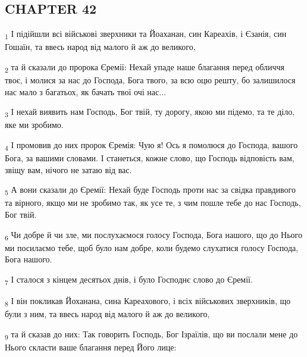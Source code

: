 \subsection{CHAPTER 42}
\begin{tcolorbox}
\textsubscript{1} І підійшли всі військові зверхники та Йоаханан, син Кареахів, і Єзанія, син Гошаїн, та ввесь народ від малого й аж до великого,
\end{tcolorbox}
\begin{tcolorbox}
\textsubscript{2} та й сказали до пророка Єремії: Нехай упаде наше благання перед обличчя твоє, і молися за нас до Господа, Бога твого, за всю оцю решту, бо залишилося нас мало з багатьох, як бачать твої очі нас...
\end{tcolorbox}
\begin{tcolorbox}
\textsubscript{3} І нехай виявить нам Господь, Бог твій, ту дорогу, якою ми підемо, та те діло, яке ми зробимо.
\end{tcolorbox}
\begin{tcolorbox}
\textsubscript{4} І промовив до них пророк Єремія: Чую я! Ось я помолюся до Господа, вашого Бога, за вашими словами. І станеться, кожне слово, що Господь відповість вам, звіщу вам, нічого не затаю від вас.
\end{tcolorbox}
\begin{tcolorbox}
\textsubscript{5} А вони сказали до Єремії: Нехай буде Господь проти нас за свідка правдивого та вірного, якщо ми не зробимо так, як усе те, з чим пошле тебе до нас Господь, Бог твій.
\end{tcolorbox}
\begin{tcolorbox}
\textsubscript{6} Чи добре й чи зле, ми послухаємося голосу Господа, Бога нашого, що до Нього ми посилаємо тебе, щоб було нам добре, коли будемо слухатися голосу Господа, Бога нашого.
\end{tcolorbox}
\begin{tcolorbox}
\textsubscript{7} І сталося з кінцем десятьох днів, і було Господнє слово до Єремії.
\end{tcolorbox}
\begin{tcolorbox}
\textsubscript{8} І він покликав Йоханана, сина Кареахового, і всіх військових зверхників, що були з ним, та ввесь народ від малого й аж до великого,
\end{tcolorbox}
\begin{tcolorbox}
\textsubscript{9} та й сказав до них: Так говорить Господь, Бог Ізраїлів, що ви послали мене до Нього скласти ваше благання перед Його лице:
\end{tcolorbox}
